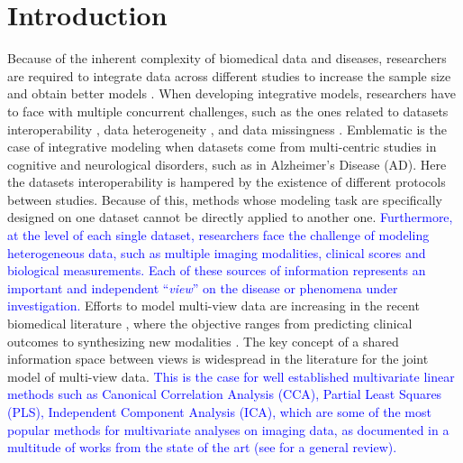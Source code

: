 \section{Introduction}

Because of the inherent complexity of biomedical data and diseases,
researchers are required to integrate data across different studies to increase the sample size and obtain better models \citep{LeSueur2020}.
%
When developing integrative models, researchers have to face with multiple concurrent challenges, such as the ones related to
datasets interoperability \citep{Tognin2020},
data heterogeneity \citep{Buch2020},
and data missingness \citep{GolrizKhatami2020}.
%
Emblematic is the case of integrative modeling when datasets come from multi-centric studies in cognitive and neurological disorders,
such as in Alzheimer's Disease (AD).
%
Here the datasets interoperability is hampered by the existence of different protocols between studies.
Because of this, methods whose modeling task are specifically designed on one dataset cannot be directly applied to another one.
\textcolor{blue}{
	Furthermore, at the level of each single dataset, researchers face the challenge of modeling heterogeneous data,
	such as multiple imaging modalities, clinical scores and biological measurements.
	Each of these sources of information represents an important and independent ``\textit{view}'' on the disease or phenomena under investigation.
}
Efforts to model multi-view data are increasing in the recent biomedical literature \citep{Vieira2020,Venugopalan2021},
where the objective ranges from predicting clinical outcomes \citep{Chen2019,AbiNader2020,Tabarestani2020}
to synthesizing new modalities \citep{Wei2019, Wei2020, Zhou2020}.
The key concept of a shared information space between views is widespread in the literature for the joint model of multi-view data.
%
\textcolor{blue}{
This is the case for well established multivariate linear methods such as
Canonical Correlation Analysis (CCA),
Partial Least Squares (PLS),
Independent Component Analysis (ICA),
which are some of the most popular methods for multivariate analyses on imaging data, as documented in a multitude of works from the state of the art (see \cite{Liu2014} for a general review).
}
